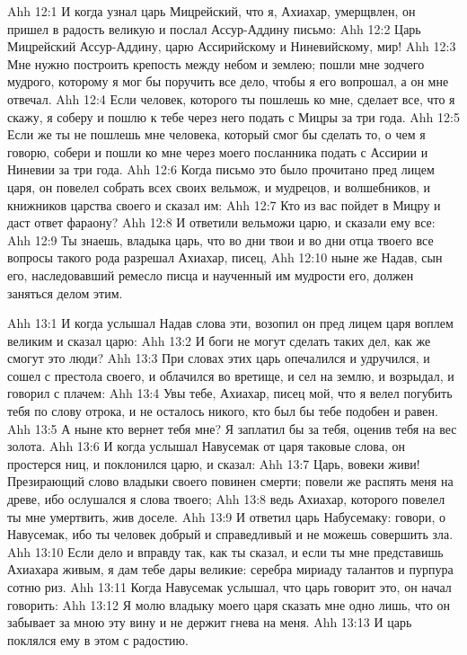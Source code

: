 \vs Ahh 12:1
И когда узнал царь Мицрейский, что я, Ахиахар, умерщвлен, он пришел в радость великую и послал Ассур-Аддину письмо:
\vs Ahh 12:2
Царь Мицрейский Ассур-Аддину, царю Ассирийскому и Ниневийскому, мир!
\vs Ahh 12:3
Мне нужно построить крепость между небом и землею; пошли мне зодчего мудрого, которому я мог бы поручить все дело, чтобы я его вопрошал, а он мне отвечал.
\vs Ahh 12:4
Если человек, которого ты пошлешь ко мне, сделает все, что я скажу, я соберу и пошлю к тебе через него подать с Мицры за три года.
\vs Ahh 12:5
Если же ты не пошлешь мне человека, который смог бы сделать то, о чем я говорю, собери и пошли ко мне через моего посланника подать с Ассирии и Ниневии за три года.
\vs Ahh 12:6
Когда письмо это было прочитано пред лицем царя, он повелел собрать всех своих вельмож, и мудрецов, и волшебников, и книжников царства своего и сказал им:
\vs Ahh 12:7
Кто из вас пойдет в Мицру и даст ответ фараону?
\vs Ahh 12:8
И ответили вельможи царю, и сказали ему все:
\vs Ahh 12:9
Ты знаешь, владыка царь, что во дни твои и во дни отца твоего все вопросы такого рода разрешал Ахиахар, писец,
\vs Ahh 12:10
ныне же Надав, сын его, наследовавший ремесло писца и наученный им мудрости его, должен заняться делом этим.

\vs Ahh 13:1
И когда услышал Надав слова эти, возопил он пред лицем царя воплем великим и сказал царю:
\vs Ahh 13:2
И боги не могут сделать таких дел, как же смогут это люди?
\vs Ahh 13:3
При словах этих царь опечалился и удручился, и сошел с престола своего, и облачился во вретище, и сел на землю, и возрыдал, и говорил с плачем:
\vs Ahh 13:4
Увы тебе, Ахиахар, писец мой, что я велел погубить тебя по слову отрока, и не осталось никого, кто был бы тебе подобен и равен.
\vs Ahh 13:5
А ныне кто вернет тебя мне? Я заплатил бы за тебя, оценив тебя на вес золота.
\vs Ahh 13:6
И когда услышал Навусемак от царя таковые слова, он простерся ниц, и поклонился царю, и сказал:
\vs Ahh 13:7
Царь, вовеки живи! Презирающий слово владыки своего повинен смерти; повели же распять меня на древе, ибо ослушался я слова твоего;
\vs Ahh 13:8
ведь Ахиахар, которого повелел ты мне умертвить, жив доселе.
\vs Ahh 13:9
И ответил царь Набусемаку: говори, о Навусемак, ибо ты человек добрый и справедливый и не можешь совершить зла.
\vs Ahh 13:10
Если дело и вправду так, как ты сказал, и если ты мне представишь Ахиахара живым, я дам тебе дары великие: серебра мириаду талантов и пурпура сотню риз.
\vs Ahh 13:11
Когда Навусемак услышал, что царь говорит это, он начал говорить:
\vs Ahh 13:12
Я молю владыку моего царя сказать мне одно лишь, что он забывает за мною эту вину и не держит гнева на меня.
\vs Ahh 13:13
И царь поклялся ему в этом с радостию.

